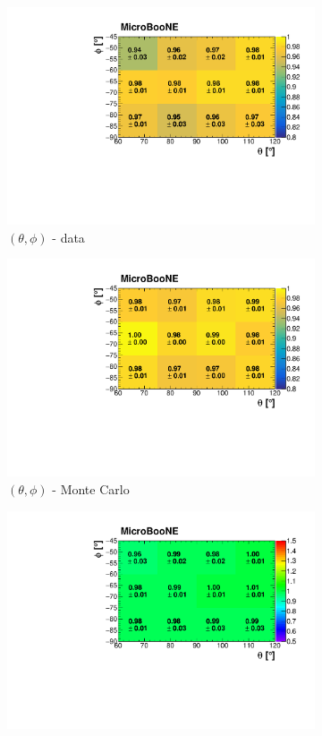 \documentclass[a4paper,11pt]{article}
\begin{document}
\begin{figure}[htbp]
  \begin{subfigure}{0.32\textwidth}
    \includegraphics[width=\linewidth]{figures/e_theta_phi.pdf}
    \caption{$(\theta,\phi)$ - data}
  \end{subfigure}\begin{subfigure}{0.32\textwidth}
  \includegraphics[width=\linewidth]{figures/theta_phi_mc.pdf}
  \caption{$(\theta,\phi)$ - Monte Carlo}
\end{subfigure}\begin{subfigure}{0.32\textwidth}
  \includegraphics[width=\linewidth]{figures/theta_phi.pdf}

\end{subfigure}
\end{figure}
\end{document}
